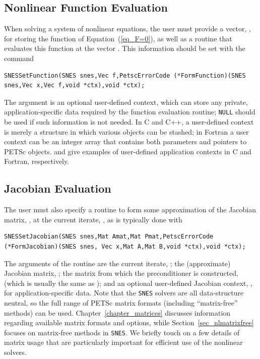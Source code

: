 \subsection{Nonlinear Function Evaluation}
\label{sec_snesfunction}

When solving a system of nonlinear equations, the user must provide
a vector, , for storing the function of
Equation~(\ref{eq_F=0}), as well as a routine that evaluates this
function at the vector .  This information should be set with
the command
\begin{lstlisting}
SNESSetFunction(SNES snes,Vec f,PetscErrorCode (*FormFunction)(SNES snes,Vec x,Vec f,void *ctx),void *ctx);
\end{lstlisting}
The argument  is an optional user-defined context, which can
store any private, application-specific data required by the
function evaluation routine; \lstinline{NULL} should be used if such information
is not needed.  In C and C++, a user-defined context is merely a
structure in which various objects can be stashed; in Fortran a user
context can be an integer array that contains both parameters and
pointers to PETSc objects. \href{https://www.mcs.anl.gov/petsc/petsc-current/src/snes/tutorials/ex5.c.html}{} and
\href{https://www.mcs.anl.gov/petsc/petsc-current/src/snes/tutorials/ex5f.F90.html}{} give examples of user-defined
application contexts in C and Fortran, respectively.

\subsection{Jacobian Evaluation}
\label{sec_snesjacobian}

The user must also specify a routine to form some approximation of the
Jacobian matrix, , at the current iterate, ,
as is typically done with
\begin{lstlisting}
SNESSetJacobian(SNES snes,Mat Amat,Mat Pmat,PetscErrorCode (*FormJacobian)(SNES snes, Vec x,Mat A,Mat B,void *ctx),void *ctx);
\end{lstlisting}
The arguments of the routine  are the current iterate, 
; the (approximate) Jacobian matrix,
; the matrix from which the preconditioner is constructed,  (which is usually the same
as );  and an optional user-defined Jacobian
context, , for application-specific data.
Note that the \lstinline{SNES} solvers are all data-structure neutral, so the full
range of PETSc matrix formats (including ``matrix-free''
methods) can be used.  Chapter~\ref{chapter_matrices} discusses
information regarding available matrix formats and options, while
Section~\ref{sec_nlmatrixfree} focuses on matrix-free
methods in \lstinline{SNES}. We briefly touch on a few details of matrix usage that are
particularly important for efficient use of the nonlinear solvers.

